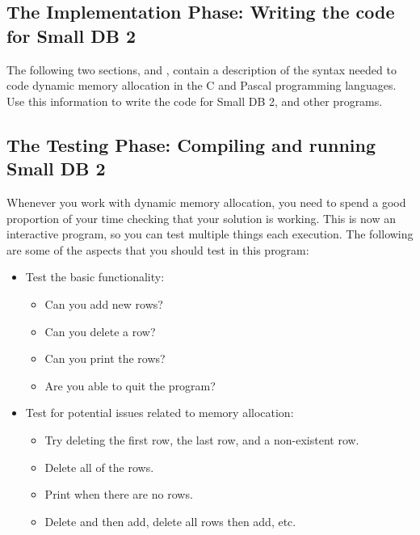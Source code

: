 
\clearpage
\subsection{The Implementation Phase: Writing the code for Small DB 2} %
\label{sub:writing_the_code_for_small_db_2}

The following two sections,   and   , contain a description of the syntax needed to code dynamic memory allocation in the C and Pascal programming languages. Use this information to write the code for Small DB 2, and other programs.


\subsection{The Testing Phase: Compiling and running Small DB 2} %
\label{ssub:the_testing_phase_compiling_and_running_small_db_2}

Whenever you work with dynamic memory allocation, you need to spend a good proportion of your time checking that your solution is working. This is now an interactive program, so you can test multiple things each execution. The following are some of the aspects that you should test in this program:

\begin{itemize}
  \item Test the basic functionality:
  \begin{itemize}
    \item Can you add new rows?
    \item Can you delete a row?
    \item Can you print the rows?
    \item Are you able to quit the program?
  \end{itemize}
  \item Test for potential issues related to memory allocation:
  \begin{itemize}
    \item Try deleting the first row, the last row, and a non-existent row.
    \item Delete all of the rows.
    \item Print when there are no rows.
    \item Delete and then add, delete all rows then add, etc.
  \end{itemize}
\end{itemize}

